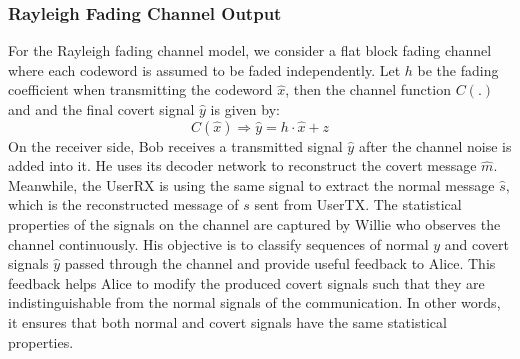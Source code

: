 \subsubsection{Rayleigh Fading Channel Output}
For the Rayleigh fading channel model, we consider a flat block fading channel where each codeword is assumed to be faded independently. Let \(h\) be the fading coefficient when transmitting the codeword \(\hat{x}\), then the channel function \(C(.)\) and and the final covert signal \(\hat{y}\) is given by:
\begin{equation}
	C(\hat{x}) \Rightarrow \hat{y} = h \cdot \hat{x} + z
\end{equation}
On the receiver side, Bob receives a transmitted signal \(\hat{y}\) after the channel noise is added into it. He uses its decoder network to reconstruct the covert message \(\hat{m}\). Meanwhile, the UserRX is using the same signal to extract the normal message \(\hat{s}\), which is the reconstructed message of \(s\) sent from UserTX. The statistical properties of the signals on the channel are captured by Willie who observes the channel continuously. His objective is to classify sequences of normal \(y\) and covert signals \(\hat{y}\) passed through the channel and provide useful feedback to Alice. This feedback helps Alice to modify the produced covert signals such that they are indistinguishable from the normal signals of the communication. In other words, it ensures that both normal and covert signals have the same statistical properties.
